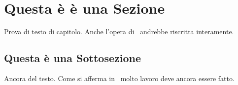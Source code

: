 \section{Questa \`e è una Sezione}

Prova di testo di capitolo. Anche l'opera di~\cite{UUID:2005} andrebbe riscritta interamente.

\subsection{Questa \`e una Sottosezione}

Ancora del testo. Come si afferma in~\cite{jones96analysis} molto lavoro deve ancora essere fatto.

